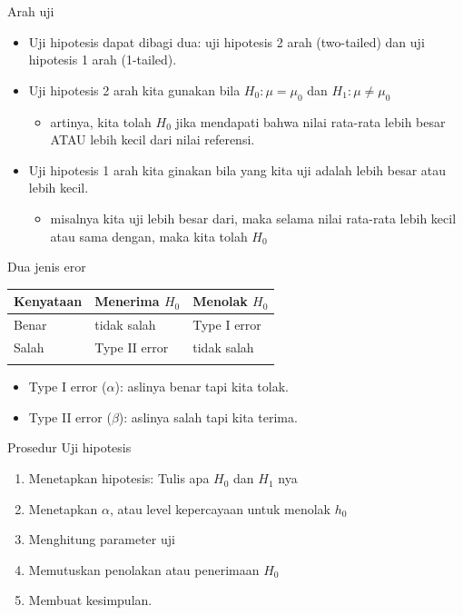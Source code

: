 \documentclass[
  ignorenonframetext,
]{beamer}
\providecommand{\tightlist}{%
  \setlength{\itemsep}{0pt}\setlength{\parskip}{0pt}}\usepackage{longtable,booktabs,array}
\begin{document}
\begin{frame}{Arah uji}
\label{arah-uji}
\begin{itemize}
\item
  Uji hipotesis dapat dibagi dua: uji hipotesis 2 arah (two-tailed) dan
  uji hipotesis 1 arah (1-tailed).
\item
  Uji hipotesis 2 arah kita gunakan bila \(H_0: \mu=\mu_0\) dan
  \(H_1: \mu\neq\mu_0\)

  \begin{itemize}
  \tightlist
  \item
    artinya, kita tolah \(H_0\) jika mendapati bahwa nilai rata-rata
    lebih besar ATAU lebih kecil dari nilai referensi.
  \end{itemize}
\item
  Uji hipotesis 1 arah kita ginakan bila yang kita uji adalah lebih
  besar atau lebih kecil.

  \begin{itemize}
  \tightlist
  \item
    misalnya kita uji lebih besar dari, maka selama nilai rata-rata
    lebih kecil atau sama dengan, maka kita tolah \(H_0\)
  \end{itemize}
\end{itemize}
\end{frame}

\begin{frame}{Dua jenis eror}
\label{dua-jenis-eror}
\begin{longtable}[]{@{}lll@{}}
\toprule\noalign{}
Kenyataan & Menerima \(H_0\) & Menolak \(H_0\) \\
\midrule\noalign{}
\endhead
Benar & tidak salah & Type I error \\
Salah & Type II error & tidak salah \\
\bottomrule\noalign{}
\end{longtable}

\begin{itemize}
\item
  Type I error (\(\alpha\)): aslinya benar tapi kita tolak.
\item
  Type II error (\(\beta\)): aslinya salah tapi kita terima.
\end{itemize}
\end{frame}

\begin{frame}{Prosedur Uji hipotesis}
\label{prosedur-uji-hipotesis}
\begin{enumerate}
\tightlist
\item
  Menetapkan hipotesis: Tulis apa \(H_0\) dan \(H_1\) nya
\item
  Menetapkan \(\alpha\), atau level kepercayaan untuk menolak \(h_0\)
\item
  Menghitung parameter uji
\item
  Memutuskan penolakan atau penerimaan \(H_0\)
\item
  Membuat kesimpulan.
\end{enumerate}
\end{frame}
\end{document}
